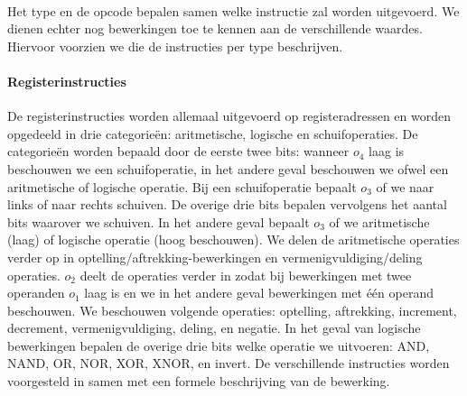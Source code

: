 \paragraph{}
Het type en de opcode bepalen samen welke instructie zal worden uitgevoerd. We dienen echter nog bewerkingen toe te kennen aan de verschillende waardes. Hiervoor voorzien we  die de instructies per type beschrijven.
\paragraph{Registerinstructies}
De registerinstructies worden allemaal uitgevoerd op registeradressen en worden opgedeeld in drie categorie\"en: aritmetische, logische en schuifoperaties. De categorie\"en worden bepaald door de eerste twee bits: wanneer $o_4$ laag is beschouwen we een schuifoperatie, in het andere geval beschouwen we ofwel een aritmetische of logische operatie. Bij een schuifoperatie bepaalt $o_3$ of we naar links of naar rechts schuiven. De overige drie bits bepalen vervolgens het aantal bits waarover we schuiven. In het andere geval bepaalt $o_3$ of we aritmetische (laag) of logische operatie (hoog beschouwen). We delen de aritmetische operaties verder op in optelling/aftrekking-bewerkingen en vermenigvuldiging/deling operaties. $o_2$ deelt de operaties verder in zodat bij bewerkingen met twee operanden $o_1$ laag is en we in het andere geval bewerkingen met \'e\'en operand beschouwen. We beschouwen volgende operaties: optelling, aftrekking, increment, decrement, vermenigvuldiging, deling,  en negatie. In het geval van logische bewerkingen bepalen de overige drie bits welke operatie we uitvoeren: AND, NAND, OR, NOR, XOR, XNOR,  en invert. De verschillende instructies worden voorgesteld in  samen met een formele beschrijving van de bewerking.
